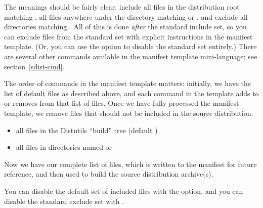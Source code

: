 \documentclass{howto}
\begin{document}
The meanings should be fairly clear: include all files in the
distribution root matching , all files anywhere under the
 directory matching  or , and
exclude all directories matching .  All of
this is done \emph{after} the standard include set, so you can exclude
files from the standard set with explicit instructions in the manifest
template.  (Or, you can use the  option to
disable the standard set entirely.)  There are several other commands
available in the manifest template mini-language; see
section~\ref{sdist-cmd}.

The order of commands in the manifest template matters: initially, we
have the list of default files as described above, and each command in
the template adds to or removes from that list of files.  Once we have
fully processed the manifest template, we remove files that should not
be included in the source distribution:
\begin{itemize}
\item all files in the Distutils ``build'' tree (default )
\item all files in directories named  or 
\end{itemize}
Now we have our complete list of files, which is written to the manifest
for future reference, and then used to build the source distribution
archive(s).

You can disable the default set of included files with the
 option, and you can disable the standard
exclude set with .
\end{document}
